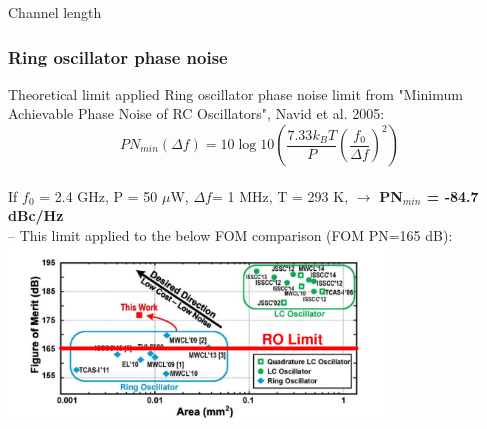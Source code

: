 \documentclass[t, screen, aspectratio=43]{beamer}
\begin{document}
\begin{frame}
\begin{block}{Channel length}
	\end{block}	
\end{frame}

\begin{frame}
	\frametitle{Ring oscillator phase noise}
	\begin{block}{Theoretical limit applied}
		\scriptsize
		Ring oscillator phase noise limit from "Minimum Achievable Phase Noise of RC Oscillators", Navid et al. 2005:
		\begin{equation}
			PN_{min}(\Delta f)= 10\log 10\left(\frac{7.33k_BT}{P}\left(\frac{f_0}{\Delta f}\right)^2\right)
		\end{equation}
		\vspace{-.8em}\\
		If $f_0$ = 2.4 GHz, P = 50 $\mu$W, $\Delta f$= 1 MHz, T = 293 K, $\rightarrow$ \textbf{PN$_{min}$ = -84.7 dBc/Hz} \\
		-- This limit applied to the below FOM comparison (FOM PN=165 dB):
		\vspace{-1.5em}
		\center\includegraphics[width=0.75\textwidth, angle=0]{ro_perf.pdf}
	\end{block}
\end{frame}
\end{document}

